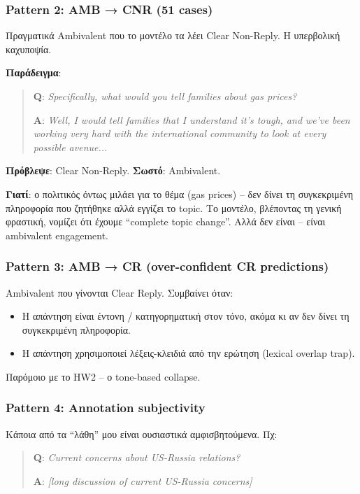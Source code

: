 \documentclass[12pt]{fphw}
\begin{document}
\subsubsection{Pattern 2: AMB → CNR (51 cases)}

Πραγματικά Ambivalent που το μοντέλο τα λέει Clear Non-Reply. Η υπερβολική καχυποψία.

\textbf{Παράδειγμα}:

\begin{quote}
\textbf{Q}: \emph{Specifically, what would you tell families about gas prices?}

\textbf{A}: \emph{Well, I would tell families that I understand it's tough, and we've been working very hard with the international community to look at every possible avenue...}
\end{quote}

\textbf{Πρόβλεψε}: Clear Non-Reply. \textbf{Σωστό}: Ambivalent.

\textbf{Γιατί}: ο πολιτικός όντως μιλάει για το θέμα (gas prices) -- δεν δίνει τη συγκεκριμένη πληροφορία που ζητήθηκε αλλά εγγίζει το topic. Το μοντέλο, βλέποντας τη γενική φραστική, νομίζει ότι έχουμε ``complete topic change''. Αλλά δεν είναι -- είναι ambivalent engagement.

\subsubsection{Pattern 3: AMB → CR (over-confident CR predictions)}

Ambivalent που γίνονται Clear Reply. Συμβαίνει όταν:

\begin{itemize}
    \item Η απάντηση είναι έντονη / κατηγορηματική στον τόνο, ακόμα κι αν δεν δίνει τη συγκεκριμένη πληροφορία.
    \item Η απάντηση χρησιμοποιεί λέξεις-κλειδιά από την ερώτηση (lexical overlap trap).
\end{itemize}

Παρόμοιο με το HW2 -- ο tone-based collapse.

\subsubsection{Pattern 4: Annotation subjectivity}

Κάποια από τα ``λάθη'' μου είναι ουσιαστικά αμφισβητούμενα. Πχ:

\begin{quote}
\textbf{Q}: \emph{Current concerns about US-Russia relations?}

\textbf{A}: \emph{[long discussion of current US-Russia concerns]}
\end{quote}
\end{document}
